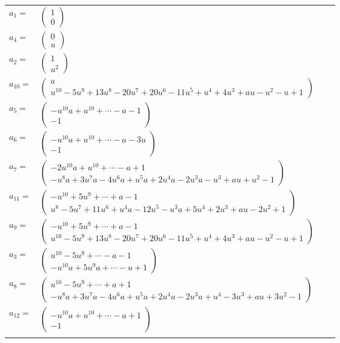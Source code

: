 \documentclass[1p]{elsarticle_modified}
\theoremstyle{definition}
\begin{document}
\begin{tabular}{m{7pt} m{180pt} m{7pt} m{180pt} }
\flushright $a_{1}=$&$\begin{pmatrix}1\\0\end{pmatrix}$ \\
\flushright $a_{4}=$&$\begin{pmatrix}0\\u\end{pmatrix}$ \\
\flushright $a_{2}=$&$\begin{pmatrix}1\\u^2\end{pmatrix}$ \\
\flushright $a_{10}=$&$\begin{pmatrix}a\\u^{10}-5 u^9+13 u^8-20 u^7+20 u^6-11 u^5+u^4+4 u^3+a u- u^2- u+1\end{pmatrix}$ \\
\flushright $a_{5}=$&$\begin{pmatrix}- u^{10} a+u^{10}+\cdots- a-1\\-1\end{pmatrix}$ \\
\flushright $a_{6}=$&$\begin{pmatrix}- u^{10} a+u^{10}+\cdots- a-3 u\\-1\end{pmatrix}$ \\
\flushright $a_{7}=$&$\begin{pmatrix}-2 u^{10} a+u^{10}+\cdots- a+1\\- u^8 a+3 u^7 a-4 u^6 a+u^5 a+2 u^4 a-2 u^3 a- u^3+a u+u^2-1\end{pmatrix}$ \\
\flushright $a_{11}=$&$\begin{pmatrix}- u^{10}+5 u^9+\cdots+a-1\\u^8-5 u^7+11 u^6+u^4 a-12 u^5- u^3 a+5 u^4+2 u^3+a u-2 u^2+1\end{pmatrix}$ \\
\flushright $a_{9}=$&$\begin{pmatrix}- u^{10}+5 u^9+\cdots+a-1\\u^{10}-5 u^9+13 u^8-20 u^7+20 u^6-11 u^5+u^4+4 u^3+a u- u^2- u+1\end{pmatrix}$ \\
\flushright $a_{3}=$&$\begin{pmatrix}u^{10}-5 u^9+\cdots- a-1\\- u^{10} a+5 u^9 a+\cdots- u+1\end{pmatrix}$ \\
\flushright $a_{8}=$&$\begin{pmatrix}u^{10}-5 u^9+\cdots+a+1\\- u^8 a+3 u^7 a-4 u^6 a+u^5 a+2 u^4 a-2 u^3 a+u^4-3 u^3+a u+3 u^2-1\end{pmatrix}$ \\
\flushright $a_{12}=$&$\begin{pmatrix}- u^{10} a+u^{10}+\cdots- a+1\\-1\end{pmatrix}$\\&\end{tabular}
\end{document}
